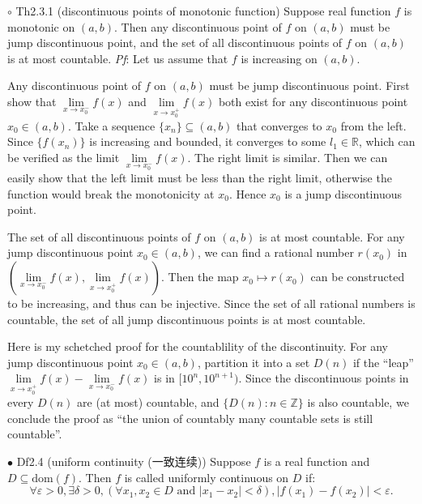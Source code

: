 \documentclass{article}
\begin{document}
\begin{Th}{$\circ$ Th2.3.1 (discontinuous points of monotonic function)}
    Suppose real function $f$ is monotonic on $(a,b)$. Then any discontinuous point of $f$ on $(a,b)$ must be jump discontinuous point, and the set of all discontinuous points of $f$ on $(a,b)$ is at most countable.
    \tcblower
    \textit{Pf}: Let us assume that $f$ is increasing on $(a,b)$.
    \begin{compactenum}
        \item Any discontinuous point of $f$ on $(a,b)$ must be jump discontinuous point. First show that $\lim\limits_{x\to x_0^-} f(x)$ and $\lim\limits_{x\to x_0^+} f(x)$ both exist for any discontinuous point $x_0\in(a,b)$. Take a sequence $\{x_n\}\subseteq(a,b)$ that converges to $x_0$ from the left. Since $\{f(x_n)\}$ is increasing and bounded, it converges to some $l_1\in\mathbb{R}$, which can be verified as the limit $\lim\limits_{x\to x_0^-} f(x)$. The right limit is similar. Then we can easily show that the left limit must be less than the right limit, otherwise the function would break the monotonicity at $x_0$. Hence $x_0$ is a jump discontinuous point.
        \item The set of all discontinuous points of $f$ on $(a,b)$ is at most countable. For any jump discontinuous point $x_0\in(a,b)$, we can find a rational number $r(x_0)$ in $(\lim\limits_{x\to x_0^-} f(x), \lim\limits_{x\to x_0^+} f(x))$. Then the map $x_0\mapsto r(x_0)$ can be constructed to be increasing, and thus can be injective. Since the set of all rational numbers is countable, the set of all jump discontinuous points is at most countable.
        \item Here is my schetched proof for the countablility of the discontinuity. For any jump discontinuous point $x_0\in(a,b)$, partition it into a set $D(n)$ if the ``leap'' $\lim\limits_{x\to x_0^+} f(x) - \lim\limits_{x\to x_0^-} f(x)$ is in $[10^n, 10^{n+1})$. Since the discontinuous points in every $D(n)$ are (at most) countable, and $\{D(n): n\in\mathbb{Z}\}$ is also countable, we conclude the proof as ``the union of countably many countable sets is still countable''.
    \end{compactenum}
\end{Th}

\begin{Df}{$\bullet$ Df2.4 (uniform continuity (一致连续))}
    Suppose $f$ is a real function and $D\subseteq\text{dom}(f)$. Then $f$ is called uniformly continuous on $D$ if:
    $$\forall\varepsilon>0, \exists\delta>0, \left(\forall x_1, x_2\in D\text{ and } |x_1-x_2|<\delta\right), |f(x_1)-f(x_2)|<\varepsilon.$$
\end{Df}
\end{document}
